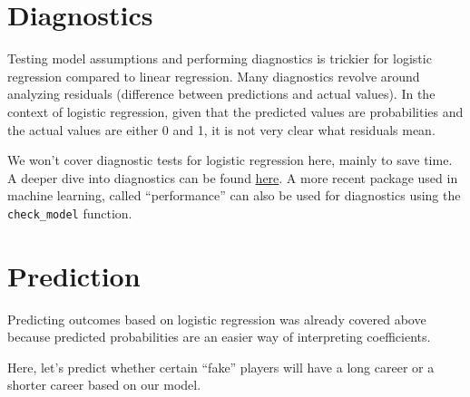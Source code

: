 \documentclass[
]{book}
\newenvironment{Shaded}{\begin{snugshade}}{\end{snugshade}}
\newcommand{\AttributeTok}[1]{\textcolor[rgb]{0.13,0.29,0.53}{#1}}
\newcommand{\CommentTok}[1]{\textcolor[rgb]{0.56,0.35,0.01}{\textit{#1}}}
\newcommand{\FloatTok}[1]{\textcolor[rgb]{0.00,0.00,0.81}{#1}}
\newcommand{\FunctionTok}[1]{\textcolor[rgb]{0.13,0.29,0.53}{\textbf{#1}}}
\newcommand{\NormalTok}[1]{#1}
\newcommand{\OtherTok}[1]{\textcolor[rgb]{0.56,0.35,0.01}{#1}}
\newcommand{\SpecialCharTok}[1]{\textcolor[rgb]{0.81,0.36,0.00}{\textbf{#1}}}
\newcommand{\StringTok}[1]{\textcolor[rgb]{0.31,0.60,0.02}{#1}}
\begin{document}
\hypertarget{diagnostics}{%
\section{Diagnostics}\label{diagnostics}}

Testing model assumptions and performing diagnostics is trickier for logistic regression compared to linear regression. Many diagnostics revolve around analyzing residuals (difference between predictions and actual values). In the context of logistic regression, given that the predicted values are probabilities and the actual values are either 0 and 1, it is not very clear what residuals mean.

We won't cover diagnostic tests for logistic regression here, mainly to save time. A deeper dive into diagnostics can be found \href{http://www.sthda.com/english/articles/36-classification-methods-essentials/148-logistic-regression-assumptions-and-diagnostics-in-r/}{here}. A more recent package used in machine learning, called ``performance'' can also be used for diagnostics using the \texttt{check\_model} function.

\hypertarget{prediction}{%
\section{Prediction}\label{prediction}}

Predicting outcomes based on logistic regression was already covered above because predicted probabilities are an easier way of interpreting coefficients.

Here, let's predict whether certain ``fake'' players
will have a long career or a shorter career based on our model.

\begin{Shaded}
\end{Shaded}
\end{document}
